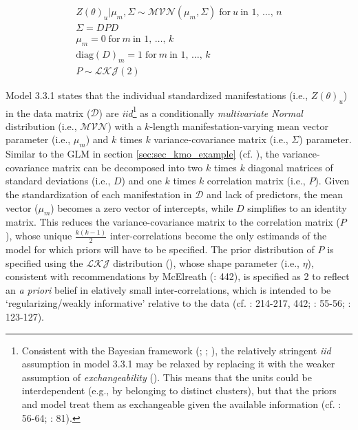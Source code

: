 \documentclass[
  10pt,
  a4paper,
  twoside]{article}
\begin{document}
\vspace{-2em}
\begin{gather*}
\tag{3.3.1}
Z(\theta)_u | \mu_m, \Sigma \sim \mathcal{MVN}(\mu_m, \Sigma) \; \text{for} \: u \: \text{in 1, } \dots \text{, } n \\
\Sigma = DPD \\
\mu_m = 0 \; \text{for} \: m \: \text{in 1, } \dots \text{, } k \\
\text{diag}(D)_m = 1 \; \text{for} \: m \: \text{in 1, } \dots \text{, } k \\
P \sim \mathcal{LKJ}(2)
\end{gather*}
\vspace{-2.5em}

Model 3.3.1 states that the individual standardized manifestations (i.e., \(Z(\theta)_u\)) in the data matrix (\(\mathcal{D}\)) are \emph{iid}\footnote{Consistent with the Bayesian framework (; ; ), the relatively stringent \emph{iid} assumption in model 3.3.1 may be relaxed by replacing it with the weaker assumption of \emph{exchangeability} (). This means that the units could be interdependent (e.g., by belonging to distinct clusters), but that the priors and model treat them as exchangeable given the available information (cf. : 56-64; : 81).} as a conditionally \emph{multivariate Normal} distribution (i.e., \(\mathcal{MVN}\)) with a \(k\)-length manifestation-varying mean vector parameter (i.e., \(\mu_m\)) and \(k\) times \(k\) variance-covariance matrix (i.e., \(\Sigma\)) parameter. Similar to the GLM in section \ref{sec:sec_kmo_example} (cf. ), the variance-covariance matrix can be decomposed into two \(k\) times \(k\) diagonal matrices of standard deviations (i.e., \(D\)) and one \(k\) times \(k\) correlation matrix (i.e., \(P\)). Given the standardization of each manifestation in \(\mathcal{D}\) and lack of predictors, the mean vector (\(\mu_m\)) becomes a zero vector of intercepts, while \(D\) simplifies to an identity matrix. This reduces the variance-covariance matrix to the correlation matrix (\(P\)), whose unique \(\frac{k(k-1)}{2}\) inter-correlations become the only estimands of the model for which priors will have to be specified. The prior distribution of \(P\) is specified using the \(\mathcal{LKJ}\) distribution (), whose shape parameter (i.e., \(\eta\)), consistent with recommendations by McElreath (: 442), is specified as 2 to reflect an \emph{a priori} belief in elatively small inter-correlations, which is intended to be `regularizing/weakly informative' relative to the data (cf. : 214-217, 442; : 55-56; : 123-127).
\end{document}
